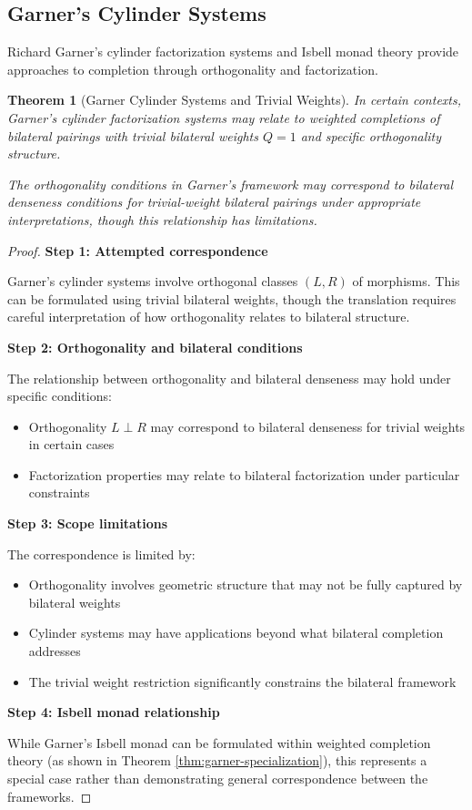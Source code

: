 \documentclass[11pt]{article}
\theoremstyle{plain}
\newtheorem{theorem}{Theorem}[section]
\theoremstyle{definition}
\theoremstyle{remark}
\begin{document}
\subsection{Garner's Cylinder Systems}

Richard Garner's cylinder factorization systems \cite{garner2018isbell} and Isbell monad theory provide approaches to completion through orthogonality and factorization.

\begin{theorem}[Garner Cylinder Systems and Trivial Weights]\label{thm:garner-cylinder-correspondence}
In certain contexts, Garner's cylinder factorization systems may relate to weighted completions of bilateral pairings with trivial bilateral weights $Q = 1$ and specific orthogonality structure.

The orthogonality conditions in Garner's framework may correspond to bilateral denseness conditions for trivial-weight bilateral pairings under appropriate interpretations, though this relationship has limitations.
\end{theorem}

\begin{proof}
\textbf{Step 1: Attempted correspondence}

Garner's cylinder systems involve orthogonal classes $(L, R)$ of morphisms. This can be formulated using trivial bilateral weights, though the translation requires careful interpretation of how orthogonality relates to bilateral structure.

\textbf{Step 2: Orthogonality and bilateral conditions}

The relationship between orthogonality and bilateral denseness may hold under specific conditions:
\begin{itemize}
\item Orthogonality $L \perp R$ may correspond to bilateral denseness for trivial weights in certain cases
\item Factorization properties may relate to bilateral factorization under particular constraints
\end{itemize}

\textbf{Step 3: Scope limitations}

The correspondence is limited by:
\begin{itemize}
\item Orthogonality involves geometric structure that may not be fully captured by bilateral weights
\item Cylinder systems may have applications beyond what bilateral completion addresses
\item The trivial weight restriction significantly constrains the bilateral framework
\end{itemize}

\textbf{Step 4: Isbell monad relationship}

While Garner's Isbell monad can be formulated within weighted completion theory (as shown in Theorem \ref{thm:garner-specialization}), this represents a special case rather than demonstrating general correspondence between the frameworks.
\end{proof}
\end{document}

